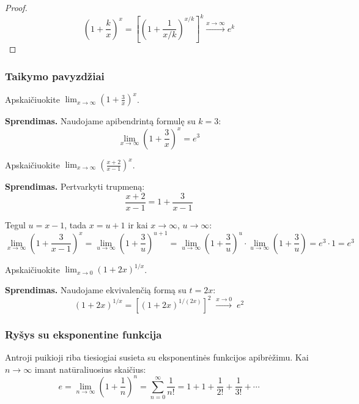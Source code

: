 \begin{proof}
\[
  \left(1 + \frac{k}{x}\right)^x
  = \left[\left(1 + \frac{1}{x/k}\right)^{x/k}\right]^k
  \xrightarrow{x \to \infty} e^k
\]
\end{proof}

\subsubsection*{Taikymo pavyzdžiai}

\begin{example}
Apskaičiuokite $\displaystyle\lim_{x \to \infty} \left(1 + \frac{3}{x}\right)^x$.

\textbf{Sprendimas.} Naudojame apibendrintą formulę su $k = 3$:
\[
  \lim_{x \to \infty} \left(1 + \frac{3}{x}\right)^x = e^3
\]
\end{example}

\begin{example}
Apskaičiuokite $\displaystyle\lim_{x \to \infty} \left(\frac{x+2}{x-1}\right)^x$.

\textbf{Sprendimas.} Pertvarkyti trupmeną:
\[
  \frac{x+2}{x-1} = 1 + \frac{3}{x-1}
\]

Tegul $u = x - 1$, tada $x = u + 1$ ir kai $x \to \infty$, $u \to \infty$:
\[
  \lim_{x \to \infty} \left(1 + \frac{3}{x-1}\right)^x
  = \lim_{u \to \infty} \left(1 + \frac{3}{u}\right)^{u+1}
  = \lim_{u \to \infty} \left(1 + \frac{3}{u}\right)^{u} \cdot \lim_{u \to \infty}\left(1 + \frac{3}{u}\right)
  = e^3 \cdot 1 = e^3
\]
\end{example}

\begin{example}
Apskaičiuokite $\displaystyle\lim_{x \to 0} (1 + 2x)^{1/x}$.

\textbf{Sprendimas.} Naudojame ekvivalenčią formą su $t = 2x$:
\[
  (1 + 2x)^{1/x} = \left[(1 + 2x)^{1/(2x)}\right]^2
  \;\xrightarrow{x \to 0}\; e^2
\]
\end{example}

\subsubsection*{Ryšys su eksponentine funkcija}

Antroji puikioji riba tiesiogiai susieta su eksponentinės funkcijos apibrėžimu. Kai $n \to \infty$ imant natūraliuosius skaičius:
\[
  e = \lim_{n \to \infty}\left(1 + \frac{1}{n}\right)^n = \sum_{n=0}^{\infty} \frac{1}{n!} = 1 + 1 + \frac{1}{2!} + \frac{1}{3!} + \cdots
\]

